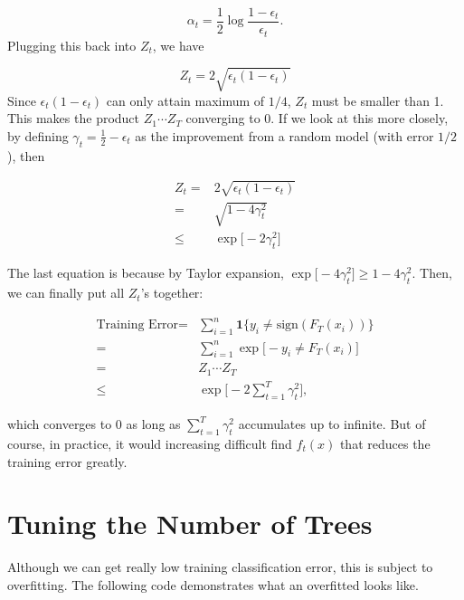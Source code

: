 \documentclass[
]{book}
\theoremstyle{definition}
\theoremstyle{definition}
\theoremstyle{definition}
\theoremstyle{definition}
\theoremstyle{remark}
\begin{document}
\[\alpha_t = \frac{1}{2} \log \frac{1 - \epsilon_t}{\epsilon_t}.\]
Plugging this back into \(Z_t\), we have

\[Z_t = 2 \sqrt{\epsilon_t(1-\epsilon_t)}\]
Since \(\epsilon_t(1-\epsilon_t)\) can only attain maximum of \(1/4\), \(Z_t\) must be smaller than 1. This makes the product \(Z_1 \cdots Z_T\) converging to 0. If we look at this more closely, by defining \(\gamma_t = \frac{1}{2} - \epsilon_t\) as the improvement from a random model (with error \(1/2\)), then

\begin{align}
Z_t =& 2 \sqrt{\epsilon_t(1-\epsilon_t)} \nonumber \\
=& \sqrt{1 - 4 \gamma_t^2} \nonumber \\
\leq& \exp\big[ - 2 \gamma_t^2 \big]
\end{align}

The last equation is because by Taylor expansion, \(\exp\big[ - 4 \gamma_t^2 \big] \geq 1 - 4 \gamma_t^2\). Then, we can finally put all \(Z_t\)'s together:

\begin{align}
\text{Training Error} =& \sum_{i = 1}^n \mathbf{1} \big\{ y_i \neq \text{sign}(F_T(x_i)) \big\} \nonumber \\
=& \sum_{i = 1}^n \exp \big[ - y_i \neq F_T(x_i) \big] \nonumber \\
=& Z_1 \cdots Z_T \nonumber \\
\leq& \exp \big[ - 2 \sum_{t=1}^T \gamma_t^2 \big],
\end{align}

which converges to 0 as long as \(\sum_{t=1}^T \gamma_t^2\) accumulates up to infinite. But of course, in practice, it would increasing difficult find \(f_t(x)\) that reduces the training error greatly.

\hypertarget{tuning-the-number-of-trees}{%
\section{Tuning the Number of Trees}\label{tuning-the-number-of-trees}}

Although we can get really low training classification error, this is subject to overfitting. The following code demonstrates what an overfitted looks like.
\end{document}
